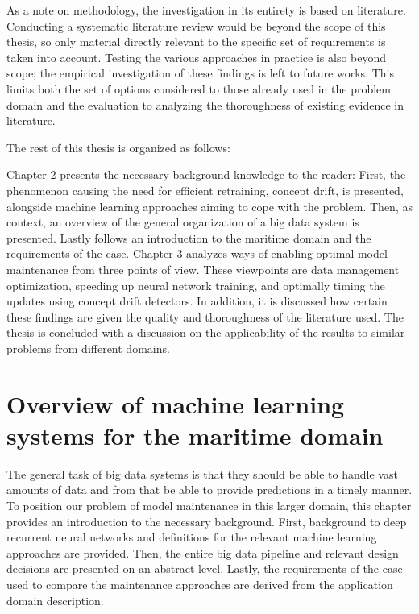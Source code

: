 As a note on methodology, the investigation in its entirety is based on literature. Conducting a systematic literature review would be beyond the scope of this thesis, so only material directly relevant to the specific set of requirements is taken into account. Testing the various approaches in practice is also beyond scope; the empirical investigation of these findings is left to future works. This limits both the set of options considered to those already used in the problem domain and the evaluation to analyzing the thoroughness of existing evidence in literature.


The rest of this thesis is organized as follows:

Chapter 2 presents the necessary background knowledge to the reader: First, the phenomenon causing the need for efficient retraining, concept drift, is presented, alongside machine learning approaches aiming to cope with the problem. Then, as context, an overview of the general organization of a big data system is presented. Lastly follows an introduction to the maritime domain and the requirements of the case. Chapter 3 analyzes ways of enabling optimal model maintenance from three points of view. These viewpoints are data management optimization, speeding up neural network training, and optimally timing the updates using concept drift detectors. In addition, it is discussed how certain these findings are given the quality and thoroughness of the literature used. The thesis is concluded with a discussion on the applicability of the results to similar problems from different domains.

\chapter[Overview of machine learning systems for the maritime domain]{Overview of machine learning\\ systems for the maritime domain}


The general task of big data systems is that they should be able to handle vast amounts of data and from that be able to provide predictions in a timely manner. To position our problem of model maintenance in this larger domain, this chapter provides an introduction to the necessary background. First, background to deep recurrent neural networks and definitions for the relevant machine learning approaches are provided. Then, the entire big data pipeline and relevant design decisions are presented on an abstract level. Lastly, the requirements of the case used to compare the maintenance approaches are derived from the application domain description.

